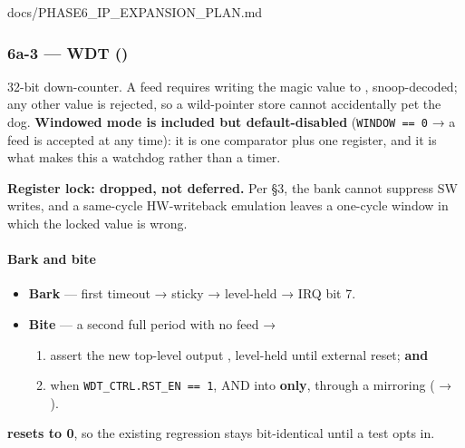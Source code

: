 \begin{relocated}{docs/PHASE6_IP_EXPANSION_PLAN.md}
\subsubsection{\texorpdfstring{6a-3 --- WDT
()}{6a-3 --- WDT ()}}\label{ds:ch:phase6-ip-expansion-plan:6a-3-wdt-rtlperiphwatchdog-timersv}

32-bit down-counter. A feed requires writing the magic value
 to , snoop-decoded; any other value is
rejected, so a wild-pointer store cannot accidentally pet the dog.
\textbf{Windowed mode is included but default-disabled}
(\texttt{WINDOW\ =\allowbreak{}=\allowbreak{}\ 0} → a feed is accepted
at any time): it is one comparator plus one register, and it is what
makes this a watchdog rather than a timer.

\textbf{Register lock: dropped, not deferred.} Per §3, the bank cannot
suppress SW writes, and a same-cycle HW-writeback emulation leaves a
one-cycle window in which the locked value is wrong.

\paragraph{Bark and bite}\label{ds:ch:phase6-ip-expansion-plan:bark-and-bite}

\begin{itemize}
\tightlist
\item
  \textbf{Bark} --- first timeout → sticky  →
  level-held  → IRQ bit 7.
\item
  \textbf{Bite} --- a second full period with no feed →

  \begin{enumerate}
  \def\labelenumi{\arabic{enumi}.}
  \tightlist
  \item
    assert the new top-level output , level-held
    until external reset; \textbf{and}
  \item
    when
    \texttt{WDT\_\allowbreak{}CTRL.\allowbreak{}RST\_\allowbreak{}EN\ =\allowbreak{}=\allowbreak{}\ 1},
    AND into \textbf{ only}, through a
     mirroring 
    ( → ).
  \end{enumerate}
\end{itemize}

 \textbf{resets to 0}, so the existing regression stays
bit-identical until a test opts in.


\end{relocated}
